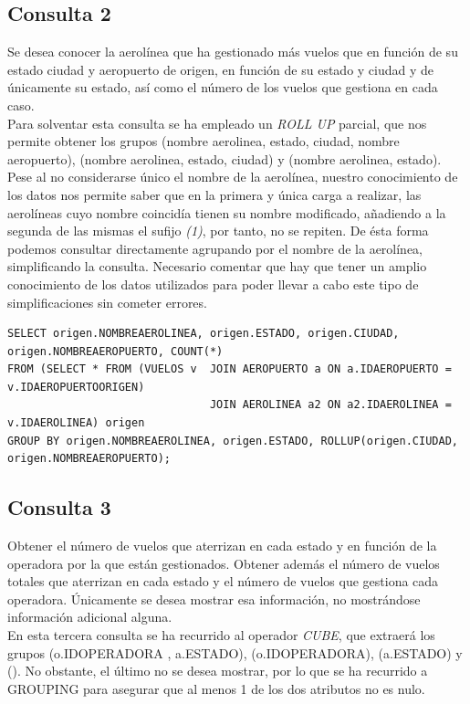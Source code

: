 \documentclass{article}
\begin{document}
\subsection{Consulta 2}
Se desea conocer la aerolínea que ha gestionado más vuelos que en función de su estado ciudad y aeropuerto de origen, en función de su estado y ciudad y de únicamente su estado, así como el número de los vuelos que gestiona en cada caso.\\

Para solventar esta consulta se ha empleado un \textit{ROLL UP} parcial, que nos permite obtener los grupos (nombre aerolinea, estado, ciudad, nombre aeropuerto), (nombre aerolinea, estado, ciudad) y (nombre aerolinea, estado). Pese al no considerarse único el nombre de la aerolínea, nuestro conocimiento de los datos nos permite saber que en la primera y única carga a realizar, las aerolíneas cuyo nombre coincidía tienen su nombre modificado, añadiendo a la segunda de las mismas el sufijo \textit{(1)}, por tanto, no se repiten. De ésta forma podemos consultar directamente agrupando por el nombre de la aerolínea, simplificando la consulta. Necesario comentar que hay que tener un amplio conocimiento de los datos utilizados para poder llevar a cabo este tipo de simplificaciones sin cometer errores.

\begin{lstlisting}
SELECT origen.NOMBREAEROLINEA, origen.ESTADO, origen.CIUDAD, origen.NOMBREAEROPUERTO, COUNT(*)
FROM (SELECT * FROM (VUELOS v  JOIN AEROPUERTO a ON a.IDAEROPUERTO = v.IDAEROPUERTOORIGEN) 
							   JOIN AEROLINEA a2 ON a2.IDAEROLINEA = v.IDAEROLINEA) origen
GROUP BY origen.NOMBREAEROLINEA, origen.ESTADO, ROLLUP(origen.CIUDAD, origen.NOMBREAEROPUERTO);

\end{lstlisting}


\newpage
\subsection{Consulta 3}

Obtener el número de vuelos que aterrizan en cada estado y en función de la operadora por la que están gestionados. Obtener además el número de vuelos totales que aterrizan en cada estado y el número de vuelos que gestiona cada operadora. Únicamente se desea mostrar esa información, no mostrándose información adicional alguna.\\

En esta tercera consulta se ha recurrido al operador \textit{CUBE}, que extraerá los grupos (o.IDOPERADORA , a.ESTADO), (o.IDOPERADORA), (a.ESTADO) y (). No obstante, el último no se desea mostrar, por lo que se ha recurrido a GROUPING para asegurar que al menos 1 de los dos atributos no es nulo.\\
\end{document}
